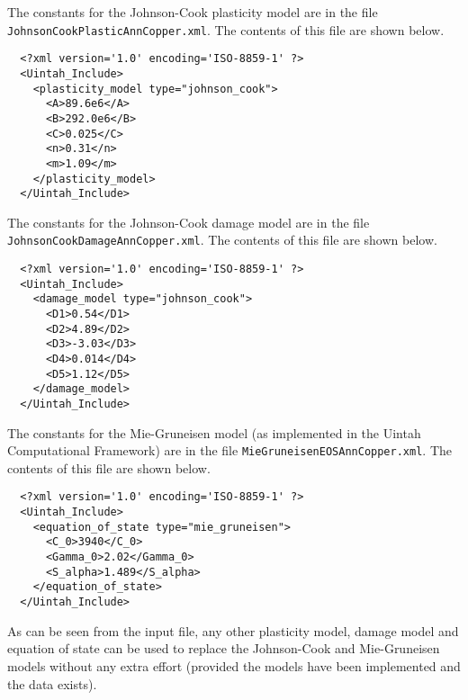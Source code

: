   The constants for the Johnson-Cook plasticity model are in the file
  \verb+JohnsonCookPlasticAnnCopper.xml+.  The contents of this file are
  shown below.
  \begin{verbatim}
  <?xml version='1.0' encoding='ISO-8859-1' ?>
  <Uintah_Include>
    <plasticity_model type="johnson_cook">
      <A>89.6e6</A>
      <B>292.0e6</B>
      <C>0.025</C>
      <n>0.31</n>
      <m>1.09</m>
    </plasticity_model>
  </Uintah_Include>
  \end{verbatim}

  The constants for the Johnson-Cook damage model are in the file
  \verb+JohnsonCookDamageAnnCopper.xml+.  The contents of this file are
  shown below.
  \begin{verbatim}
  <?xml version='1.0' encoding='ISO-8859-1' ?>
  <Uintah_Include>
    <damage_model type="johnson_cook">
      <D1>0.54</D1>
      <D2>4.89</D2>
      <D3>-3.03</D3>
      <D4>0.014</D4>
      <D5>1.12</D5>
    </damage_model>
  </Uintah_Include>
  \end{verbatim}

  The constants for the Mie-Gruneisen model (as implemented in the 
  Uintah Computational Framework) are in the file
  \verb+MieGruneisenEOSAnnCopper.xml+.  The contents of this file are
  shown below.
  \begin{verbatim}
  <?xml version='1.0' encoding='ISO-8859-1' ?>
  <Uintah_Include>
    <equation_of_state type="mie_gruneisen">
      <C_0>3940</C_0>
      <Gamma_0>2.02</Gamma_0>
      <S_alpha>1.489</S_alpha>
    </equation_of_state>
  </Uintah_Include>
  \end{verbatim}

  As can be seen from the input file, any other plasticity model, damage
  model and equation of state can be used to replace the Johnson-Cook
  and Mie-Gruneisen models without any extra effort (provided the models
  have been implemented and the data exists).


